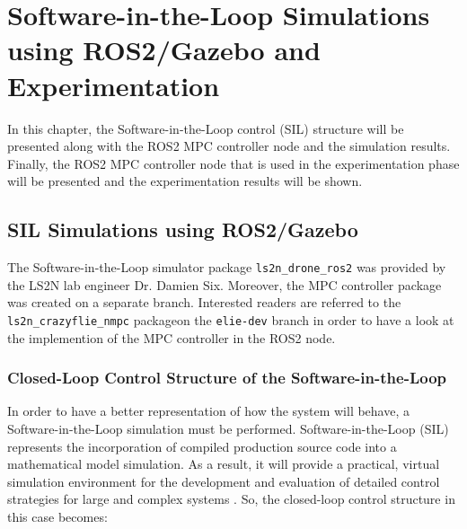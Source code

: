 \documentclass{thesisreport}
\begin{document}
  \chapter{Software-in-the-Loop Simulations using ROS2/Gazebo and Experimentation}
 	In this chapter, the Software-in-the-Loop control (SIL) structure will be presented along with the ROS2 MPC controller node and the simulation results. Finally, the ROS2 MPC controller node  that is used in the  experimentation phase will be presented and the experimentation results will be shown.
	\section{SIL Simulations using ROS2/Gazebo}\label{sec:SIL_simulations}

The Software-in-the-Loop simulator package \texttt{ls2n\_drone\_ros2}\protect\footnotemark  
 was provided by the LS2N lab engineer Dr. Damien Six\protect\footnotemark. Moreover, the MPC controller package was created on a separate branch.
Interested readers are referred to the \texttt{ls2n\_crazyflie\_nmpc} package\protect\footnotemark on the \texttt{elie-dev} branch in order to have a look at the implemention of the MPC controller in the ROS2 node.	



	
	\subsection{Closed-Loop Control Structure of the Software-in-the-Loop}

In order to have a better representation of how the system will behave, a Software-in-the-Loop simulation must be performed. Software-in-the-Loop (SIL) represents the incorporation of compiled production source code into a mathematical model simulation. As a result, it will provide a practical, virtual simulation environment for the development and evaluation of detailed control strategies for large and complex systems \cite{SIL2021}. So, the closed-loop control structure in this case becomes:
\end{document}

